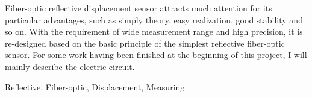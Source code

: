 \begin{EnAbstract}
    Fiber-optic reflective displacement sensor attracts much attention for its particular advantages, such as simply theory, easy realization, good stability and so on. With the requirement of wide measurement range and high precision, it is re-designed based on the basic principle of the simplest reflective fiber-optic sensor. For some work having been finished at the beginning of this project, I will mainly describe the electric circuit.
  
  
    \EnglishKeyWord Reflective, Fiber-optic, Displacement, Measuring
\end{EnAbstract}